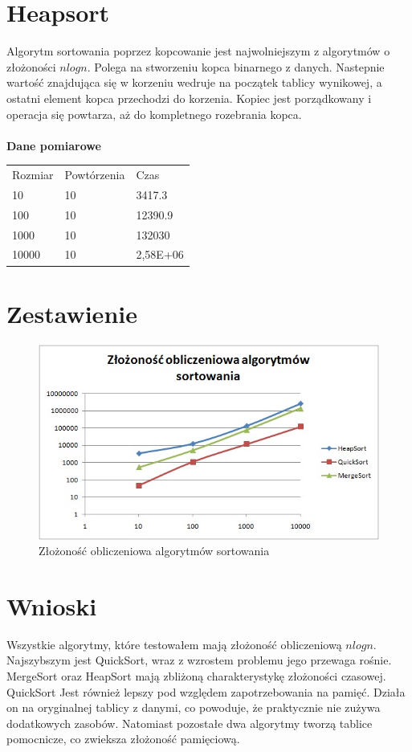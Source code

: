 \documentclass[12pt,oneside]{mwbk}
\begin{document}
	
\section {Heapsort}

	\indent Algorytm sortowania poprzez kopcowanie jest najwolniejszym z algorytmów o złożoności $ nlogn $. Polega na stworzeniu kopca binarnego z danych. Nastepnie wartość znajdująca się w korzeniu wedruje na początek tablicy wynikowej, a ostatni element kopca przechodzi do korzenia. Kopiec jest porządkowany i operacja się powtarza, aż do kompletnego rozebrania kopca.\\
	\\
	\textbf{Dane pomiarowe}
	
	
	\begin{table}[h]
	\begin{tabular}{lll}
	Rozmiar & Powtórzenia & Czas         \\
	10&10&3417.3\\
	100&10&12390.9\\
	1000&10&132030\\
	10000&10&2,58E+06\\
	\end{tabular}
	\end{table}

	
\section{Zestawienie}

	\begin{figure}[!h]
	\centering
	\includegraphics[scale=0.6]{rys/zlozonosc.jpg}
	\caption{Złożoność obliczeniowa algorytmów sortowania}
	\end{figure}

\section{Wnioski}
\indent Wszystkie algorytmy, które testowałem mają złożoność obliczeniową $nlogn$. Najszybszym jest QuickSort, wraz z wzrostem problemu jego przewaga rośnie. MergeSort oraz HeapSort mają zbliżoną charakterystykę złożoności czasowej. 
\indent QuickSort Jest również lepszy pod względem zapotrzebowania na pamięć. Działa on na oryginalnej tablicy z danymi, co powoduje, że praktycznie nie zużywa dodatkowych zasobów. Natomiast pozostałe dwa algorytmy tworzą tablice pomocnicze, co zwieksza złożoność pamięciową.
	
\end{document}
